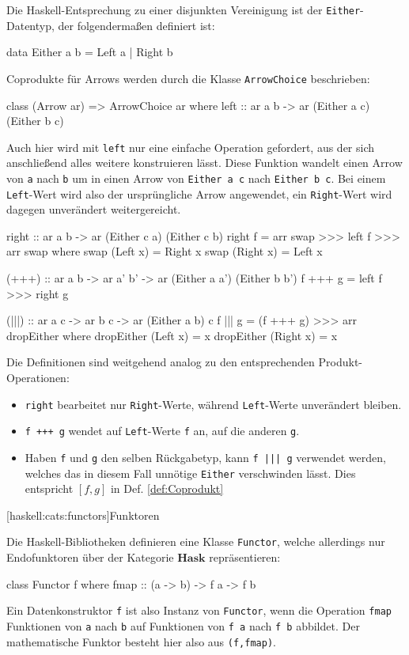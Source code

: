 \documentclass[11pt, a4paper, bibgerm]{scrbook}
\newcommand\icode[1]{\lstinline?#1?}
\newcommand\lsubsection{}
\newcommand{\dref}[1]{Def. \ref{def:#1}}
\begin{document}
Die Haskell-Entsprechung zu einer disjunkten Vereinigung ist der
\icode{Either}-Datentyp, der folgendermaßen definiert ist:
\begin{code}
data Either a b = Left a | Right b
\end{code}
Coprodukte für Arrows werden durch die Klasse \icode{ArrowChoice} beschrieben:
\begin{code}
class (Arrow ar) => ArrowChoice ar where
  left :: ar a b -> ar (Either a c) (Either b c)
\end{code}
Auch hier wird mit \icode{left} nur eine einfache Operation gefordert,
aus der sich anschließend alles weitere konstruieren lässt. Diese
Funktion wandelt einen Arrow von \icode{a} nach \icode{b} um in
einen Arrow von \icode{Either a c} nach \icode{Either b c}. Bei einem
\icode{Left}-Wert wird also der ursprüngliche Arrow angewendet, ein
\icode{Right}-Wert wird dagegen unverändert weitergereicht.
\begin{code}
  right :: ar a b -> ar (Either c a) (Either c b)
  right f = arr swap >>> left f >>> arr swap
    where swap (Left x)  = Right x
          swap (Right x) = Left x

  (+++) :: ar a b -> ar a' b' -> ar (Either a a') (Either b b')
  f +++ g = left f >>> right g

  (|||) :: ar a c -> ar b c -> ar (Either a b) c
  f ||| g = (f +++ g) >>> arr dropEither
    where dropEither (Left x)  = x
          dropEither (Right x) = x

\end{code} %
Die Definitionen sind weitgehend analog zu den entsprechenden
Produkt-Operationen:
\begin{itemize}
\item \icode{right} bearbeitet nur \icode{Right}-Werte, während
  \icode{Left}-Werte unverändert bleiben.
\item \icode{f +++ g} wendet auf \icode{Left}-Werte \icode{f} an, auf
  die anderen \icode{g}.
\item Haben \icode{f} und \icode{g} den selben Rückgabetyp, kann
  \icode{f ||| g} verwendet werden, welches das in diesem Fall unnötige
  \icode{Either} verschwinden lässt. Dies entspricht $[f,g]$ in
  \dref{Coprodukt}
\end{itemize}

\lsubsection[haskell:cats:functors]{Funktoren}

Die Haskell-Bibliotheken definieren eine Klasse \icode{Functor}, welche
allerdings nur Endofunktoren über der Kategorie $\mathbf{Hask}$ repräsentieren:
\begin{code}
class Functor f where
  fmap :: (a -> b) -> f a -> f b
\end{code}
Ein Datenkonstruktor \icode{f} ist also Instanz von \icode{Functor},
wenn die Operation \icode{fmap} Funktionen von \icode{a} nach \icode{b}
auf Funktionen von \icode{f a} nach \icode{f b} abbildet. Der
mathematische Funktor besteht hier also aus \icode{(f,fmap)}.
\end{document}
